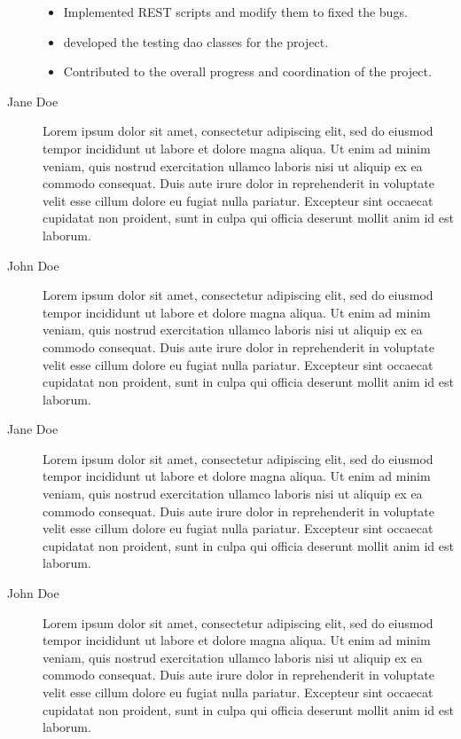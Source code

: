 \begin{description}
\begin{itemize}
		\item Implemented REST scripts and modify them to fixed the bugs.
		\item developed the testing dao classes for the project.
		\item Contributed to the overall progress and coordination of the project.
	\end{itemize}
	\item[Jane Doe] Lorem ipsum dolor sit amet, consectetur adipiscing elit, sed do eiusmod tempor incididunt ut labore et dolore magna aliqua. Ut enim ad minim veniam, quis nostrud exercitation ullamco laboris nisi ut aliquip ex ea commodo consequat. Duis aute irure dolor in reprehenderit in voluptate velit esse cillum dolore eu fugiat nulla pariatur. Excepteur sint occaecat cupidatat non proident, sunt in culpa qui officia deserunt mollit anim id est laborum.
	\item[John Doe] Lorem ipsum dolor sit amet, consectetur adipiscing elit, sed do eiusmod tempor incididunt ut labore et dolore magna aliqua. Ut enim ad minim veniam, quis nostrud exercitation ullamco laboris nisi ut aliquip ex ea commodo consequat. Duis aute irure dolor in reprehenderit in voluptate velit esse cillum dolore eu fugiat nulla pariatur. Excepteur sint occaecat cupidatat non proident, sunt in culpa qui officia deserunt mollit anim id est laborum.
	\item[Jane Doe] Lorem ipsum dolor sit amet, consectetur adipiscing elit, sed do eiusmod tempor incididunt ut labore et dolore magna aliqua. Ut enim ad minim veniam, quis nostrud exercitation ullamco laboris nisi ut aliquip ex ea commodo consequat. Duis aute irure dolor in reprehenderit in voluptate velit esse cillum dolore eu fugiat nulla pariatur. Excepteur sint occaecat cupidatat non proident, sunt in culpa qui officia deserunt mollit anim id est laborum.
	\item[John Doe] Lorem ipsum dolor sit amet, consectetur adipiscing elit, sed do eiusmod tempor incididunt ut labore et dolore magna aliqua. Ut enim ad minim veniam, quis nostrud exercitation ullamco laboris nisi ut aliquip ex ea commodo consequat. Duis aute irure dolor in reprehenderit in voluptate velit esse cillum dolore eu fugiat nulla pariatur. Excepteur sint occaecat cupidatat non proident, sunt in culpa qui officia deserunt mollit anim id est laborum.

\end{description}
